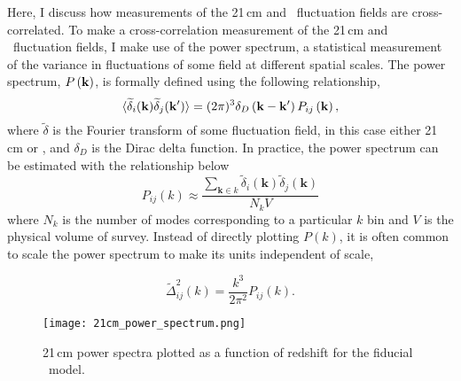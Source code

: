 \label{sec:cross-power}

Here, I discuss how measurements of the 21\,cm and \lya\ fluctuation fields are
cross-correlated. To make a cross-correlation measurement of the 21\,cm and \lya\
fluctuation fields, I make use of the power spectrum, a statistical measurement
of the variance in fluctuations of some field at different spatial scales. The power
spectrum, $P \left({\bf k} \right)$, is formally defined using the following relationship,
\begin{equation}
\langle \widetilde{\delta}_i ({\bf k}) \widetilde{\delta}_j ({\bf k'}) \rangle = (2 \pi) ^3 \delta_D \left( {\bf k} - {\bf k'} \right) P_{ij} \left({\bf k} \right),
\end{equation}
where $\widetilde{\delta}$ is the Fourier transform of some fluctuation field, in this
case either 21\,cm or \lya, and $\delta_D$ is the Dirac delta function.
In practice, the power spectrum can be estimated with the relationship below
\begin{equation}
P_{ij}\left( k\right) \approx \frac{\sum_{\textbf{k} \in k} \widetilde{\delta}_i \left( \textbf{k}\right) \widetilde{\delta}_j \left( \textbf{k}\right)}{N_k V}
\end{equation}
where $N_k$ is the number of modes corresponding to a particular $k$ bin and $V$ is
the physical volume of survey. Instead of directly plotting $P\left( k\right)$,
it is often common to scale the power spectrum to make its units independent of
scale,

\begin{equation}
    \widetilde{\Delta}^2_{ij} \left( k \right) = \frac{k^3}{2 \pi ^2} P_{ij} \left( k \right).
\end{equation}

\begin{figure}[ht]
	\centering
	\texttt{[image: 21cm\_power\_spectrum.png]}
	\caption[21\,cm Power Spectrum]{21\,cm power spectra plotted as a function of redshift for the fiducial \fastsim\
           model.}
	\label{fig:21cm_ps}
\end{figure}

